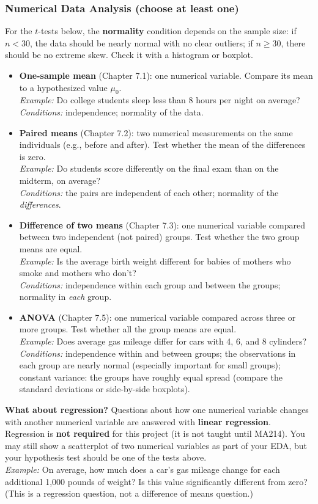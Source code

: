 \subsubsection*{Numerical Data Analysis (choose at least one)}
For the $t$-tests below, the \textbf{normality} condition depends on the sample size: if $n < 30$, the data should be nearly normal with no clear outliers; if $n \ge 30$, there should be no extreme skew. Check it with a histogram or boxplot.
\begin{itemize}
    \item \textbf{One-sample mean} (Chapter 7.1): one numerical variable. Compare its mean to a hypothesized value $\mu_0$.\\
    \emph{Example:} Do college students sleep less than 8 hours per night on average?\\
    \emph{Conditions:} independence; normality of the data.
    \item \textbf{Paired means} (Chapter 7.2): two numerical measurements on the same individuals (e.g., before and after). Test whether the mean of the differences is zero.\\
    \emph{Example:} Do students score differently on the final exam than on the midterm, on average?\\
    \emph{Conditions:} the pairs are independent of each other; normality of the \emph{differences}.
    \item \textbf{Difference of two means} (Chapter 7.3): one numerical variable compared between two independent (not paired) groups. Test whether the two group means are equal.\\
    \emph{Example:} Is the average birth weight different for babies of mothers who smoke and mothers who don't?\\
    \emph{Conditions:} independence within each group and between the groups; normality in \emph{each} group.
    \item \textbf{ANOVA} (Chapter 7.5): one numerical variable compared across three or more groups. Test whether all the group means are equal.\\
    \emph{Example:} Does average gas mileage differ for cars with 4, 6, and 8 cylinders?\\
    \emph{Conditions:} independence within and between groups; the observations in each group are nearly normal (especially important for small groups); constant variance: the groups have roughly equal spread (compare the standard deviations or side-by-side boxplots).
\end{itemize}

\noindent\textbf{What about regression?} Questions about how one numerical variable changes with another numerical variable are answered with \textbf{linear regression}. Regression is \textbf{not required} for this project (it is not taught until MA214). You may still show a scatterplot of two numerical variables as part of your EDA, but your hypothesis test should be one of the tests above.\\
\emph{Example:} On average, how much does a car's gas mileage change for each additional 1{,}000 pounds of weight? Is this value significantly different from zero? (This is a regression question, not a difference of means question.)
